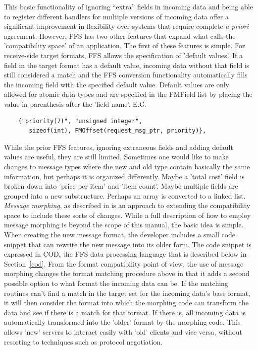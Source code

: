 This basic functionality of ignoring ``extra'' fields in incoming data and
being able to register different handlers for multiple versions of incoming
data offer a significant improvement in flexibility over systems that
require complete {\it a priori} agreement.  However, FFS has two other
features that expand what \cite{sandipmorph} calls the 'compatibility space'
of an application.  The first of these features is simple.  For receive-side
target formats, FFS allows the specification of 'default values'.  If a
field in the target format has a default value, incoming data without that
field is still considered a match and the FFS conversion functionality
automatically fills the incoming field with the specified default value.
Default values are only allowed for atomic data types and are specified in
the FMField list by placing the value in parenthesis after the 'field
name'.  E.G.
\begin{verbatim}
    {"priority(7)", "unsigned integer", 
       sizeof(int), FMOffset(request_msg_ptr, priority)},
\end{verbatim}

While the prior FFS features, ignoring extraneous
fields and adding default values are useful, they are still limited.
Sometimes one would like to make changes to message types where the new and
old type contain basically the same information, but perhaps it is organized
differently.  Maybe a 'total cost' field is broken down into 'price per
item' and 'item count'.  Maybe multiple fields are grouped into a new
substructure.  Perhaps an array is converted to a linked list.  {\it Message
  morphing}, as described in \cite{sandipmorph} is an approach to extending
the compatibility space to include these sorts of changes.  While a full
description of how to employ message morphing is beyond the scope of this
manual, the basic idea is simple.  When creating the new message format, the
developer includes a small code snippet that can rewrite the new message
into its older form.   The code snippet is expressed in COD, the FFS data
processing language that is described below in Section~\ref{cod}.  From the
format compatibility point of view, the use of message morphing changes the
format matching procedure above in that it adds a second possible option to
what format the incoming data can be.  If the matching routines can't find a
match in the target set for the incoming data's base format, it will then
consider the format into which the morphing code can transform the data and
see if there is a match for that format.  If there is, all incoming data is
automatically transformed into the 'older' format by the morphing code.
This allows 'new' servers to interact easily with 'old' clients and vice
versa, without resorting to techniques such as protocol negotiation.

